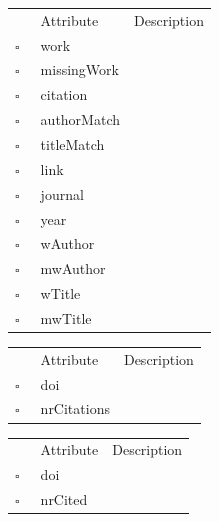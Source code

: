 \begin{table}
\caption{LinkCandidate  }

\begin{longtable}{llp{8cm}}
& Attribute & Description \\
$\square$\ & work &  \\
$\square$\ & missingWork &  \\
$\square$\ & citation &  \\
$\square$\ & authorMatch &  \\
$\square$\ & titleMatch &  \\
$\square$\ & link &  \\
$\square$\ & journal &  \\
$\square$\ & year &  \\
$\square$\ & wAuthor &  \\
$\square$\ & mwAuthor &  \\
$\square$\ & wTitle &  \\
$\square$\ & mwTitle &  \\
\end{longtable}
\label{attr:LinkCandidate}
\end{table}

\begin{table}
\caption{MissingCitedWork  }

\begin{longtable}{llp{8cm}}
& Attribute & Description \\
$\square$\ & doi &  \\
$\square$\ & nrCitations &  \\
\end{longtable}
\label{attr:MissingCitedWork}
\end{table}

\begin{table}
\caption{MissingCitingWork  }

\begin{longtable}{llp{8cm}}
& Attribute & Description \\
$\square$\ & doi &  \\
$\square$\ & nrCited &  \\
\end{longtable}
\label{attr:MissingCitingWork}
\end{table}

